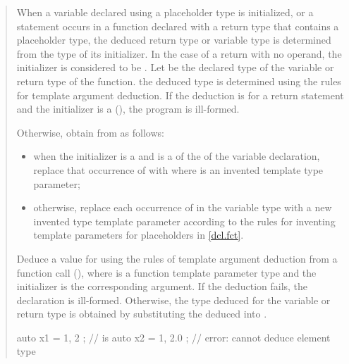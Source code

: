 \begin{quote}
\pnum
When a variable declared using a placeholder type is initialized, or a 
 statement occurs in a function declared with a return type 
that contains a placeholder type, the deduced return type or variable type 
is determined from the type of its initializer.
%
In the case of a return with no operand, the initializer is considered to 
be .
%
Let  be the declared type of the variable or return type of the 
function.
%
the deduced type is determined using the rules for template argument
deduction. 
%
If the deduction is for a return statement and the initializer is a 
 (), the program is
ill-formed. 
%

\begin{addedblock}
Otherwise, obtain  from  as follows:
\begin{itemize}
\item when the initializer is a 
and  is a  of the 
 of the variable declaration, replace that 
occurrence of  with 
where  is an invented template type parameter;

\item otherwise, replace each occurrence of  in the
variable type with a new invented type template parameter
according to the rules for inventing template parameters
for placeholders in \ref{dcl.fct}.
\end{itemize}
\end{addedblock}
% 
Deduce a value for   using the rules of template argument deduction from 
a function call (), where  is a function 
template parameter type and the initializer is the corresponding argument.
%
If the deduction fails, the declaration is ill-formed. 
% 
Otherwise, the type deduced for the variable or return type is obtained by 
substituting the deduced   into .
% 
\enterexample
\begin{codeblock}
auto x1 = { 1, 2 };                 //   is 
auto x2 = { 1, 2.0 };               // error: cannot deduce element type
\end{codeblock}
\exitexample
\end{quote}

